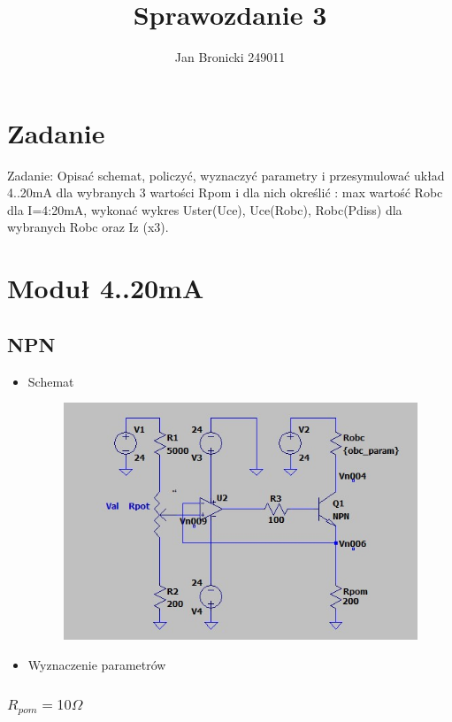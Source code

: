 \documentclass{article}
\title{Sprawozdanie 3}
\author{Jan Bronicki 249011}
\date{}
\begin{document}
\maketitle

\section{Zadanie}

Zadanie: Opisać schemat, policzyć, wyznaczyć parametry i przesymulować układ 4..20mA dla
wybranych 3 wartości Rpom i dla nich określić : max wartość Robc dla I=4:20mA, wykonać wykres
Uster(Uce), Uce(Robc), Robc(Pdiss) dla wybranych Robc oraz Iz (x3).

\section{Moduł 4..20mA}

\subsection{NPN}

\begin{itemize}
    \item Schemat
        \begin{figure}[h!]
            \centering
            \includegraphics[scale=0.4]{main_schemat.jpg}
        \end{figure}
    \item Wyznaczenie parametrów
\end{itemize}

\newpage


\subsubsection{$R_{pom} = 10 \Omega$}
\end{document}
